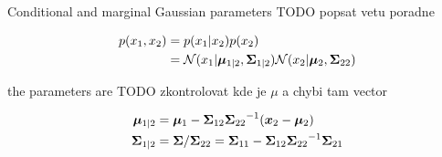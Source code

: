 \begin{thm}
    Conditional and marginal Gaussian parameters \citep{murphy2012machine} {TODO popsat vetu poradne}
    
    \begin{align}
    p(x_1, x_2) &= p(x_1 | x_2) p(x_2) \\
    &= {\mathcal{N}}(x_1 | {\bm{\mu}}_{1|2}, {{\bm{\Sigma}}_{1|2}}) {\mathcal{N}}(x_2 | {\bm{\mu}}_2, {{\bm{\Sigma}}_{22}})
    \end{align}
    
    the parameters are {TODO zkontrolovat kde je $\mu$ a chybi tam vector}
    
    \begin{align}
    {\bm{\mu}}_{1|2} &= {\bm{\mu}}_1 - {{\bm{\Sigma}}_{12}} {{\bm{\Sigma}}_{22}}^{-1} ({\bm{x}}_2 - {\bm{\mu}}_2) \\
    {{\bm{\Sigma}}_{1|2}} &= {\bm{\Sigma}} / {{\bm{\Sigma}}_{22}} = {{\bm{\Sigma}}_{11}} - {{\bm{\Sigma}}_{12}} {{\bm{\Sigma}}_{22}}^{-1} {{\bm{\Sigma}}_{21}}
    \end{align}
\end{thm}

